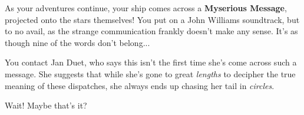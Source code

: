 As your adventures continue, your ship comes across a \textbf{Myserious
Message}, projected onto the stars themselves! You put on a John
Williams soundtrack, but to no avail, as the strange communication
frankly doesn't make any sense. It's as though nine of the
words don't belong...

You contact Jan Duet, who says this isn't the first time she's
come across such a message. She suggests that while she's gone
to great \textit{lengths} to decipher the true meaning of
these dispatches, she always ends up chasing her tail in
\textit{circles}.

Wait! Maybe that's it? 

